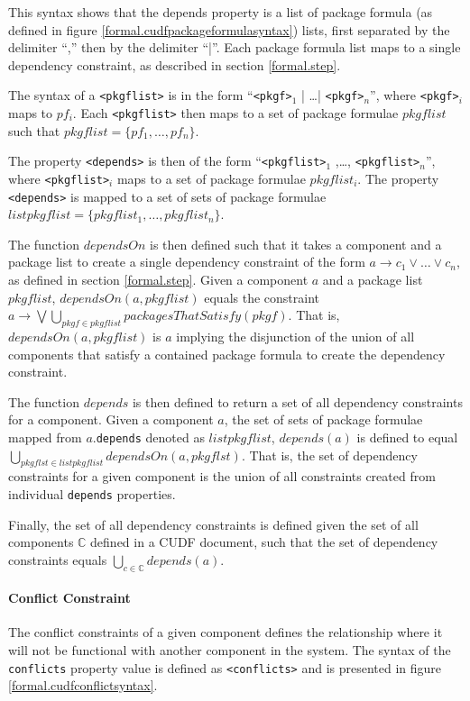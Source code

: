 This syntax shows that the depends property is a list of package formula (as defined in figure \ref{formal.cudfpackageformulasyntax}) lists, 
first separated by the delimiter ``,'' then by the delimiter ``|''.
Each package formula list maps to a single dependency constraint, as described in section \ref{formal.step}.

The syntax of a \verb+<pkgflist>+ is in the form ``\verb+<pkgf>+$_1$ | \ldots | \verb+<pkgf>+$_n$'', where \verb+<pkgf>+$_i$ maps to $pf_i$.
Each \verb+<pkgflist>+ then maps to a set of package formulae $pkgflist$ such that $pkgflist = \{pf_1,\ldots, pf_n\}$.

The property \verb+<depends>+ is then of the form ``\verb+<pkgflist>+$_1$ ,\ldots, \verb+<pkgflist>+$_n$'', where \verb+<pkgflist>+$_i$ maps to a set of package formulae $pkgflist_i$. 
The property \verb+<depends>+ is mapped to a set of sets of package formulae $listpkgflist = \{pkgflist_1,\ldots,pkgflist_n\}$.

The function $dependsOn$ is then defined such that it takes a component and a package list to create a single dependency constraint of the form $a \rightarrow c_1 \vee \ldots \vee c_n$,
as defined in section \ref{formal.step}.
Given a component $a$ and a package list $pkgflist$, 
$dependsOn(a,pkgflist)$ equals the constraint $a \rightarrow \bigvee  \bigcup \limits_{pkgf \in pkgflist} packagesThatSatisfy(pkgf)$.
That is, $dependsOn(a,pkgflist)$ is $a$ implying the disjunction of the union of all components that satisfy a contained package formula to create the dependency constraint. 

The function $depends$ is then defined to return a set of all dependency constraints for a component.
Given a component $a$, the set of sets of package formulae mapped from $a$.\verb+depends+ denoted as $listpkgflist$,
$depends(a)$ is defined to equal $\bigcup \limits_{pkgflst \in listpkgflist} dependsOn(a,pkgflst)$.
That is, the set of dependency constraints for a given component is the union of all constraints created from individual \verb+depends+ properties.

Finally, the set of all dependency constraints is defined given the set of all components $\mathbb{C}$ defined in a CUDF document,
such that the set of dependency constraints equals $\bigcup \limits_{c\in \mathbb{C}} depends(a)$.

\paragraph{Conflict Constraint}
The conflict constraints of a given component defines the relationship where it will not be functional with another component in the system.
The syntax of the \verb+conflicts+ property value is defined as \verb+<conflicts>+ and is presented in figure \ref{formal.cudfconflictsyntax}.



